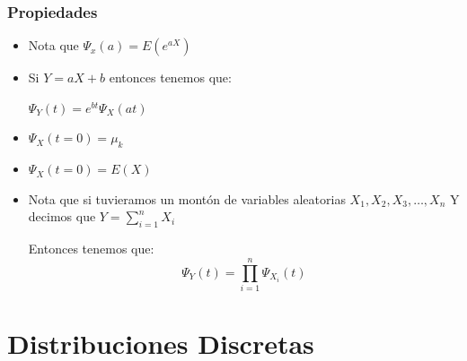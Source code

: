\documentclass[12pt, fleqn]{report}                             %
\theoremstyle{break}                                            %
\begin{document}
                \subsubsection{Propiedades}

                    \begin{itemize}

                        \item
                            Nota que $\Psi_x(a) = E(e^{aX})$

                        \item
                            Si $Y = aX + b$ entonces tenemos que:

                            $\Psi_Y(t) = e^{bt} \Psi_X(at)$


                        \item
                            $\Psi_X (t = 0) = \mu_k$

                        \item
                            $\Psi_X (t = 0) = E(X)$

                        \item
                            Nota que si tuvieramos un montón de variables aleatorias
                            $X_1, X_2, X_3, \dots, X_n$
                            Y decimos que $\displaystyle Y = \sum_{i = 1}^n X_i$

                            Entonces tenemos que:
                            \begin{equation*}
                                \Psi_Y(t) = \prod_{i = 1}^n \Psi_{X_i}(t)
                            \end{equation*}



                    \end{itemize}




        \clearpage
        \section{Distribuciones Discretas}
\end{document}
